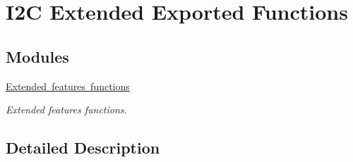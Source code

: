 \hypertarget{group___i2_c_ex___exported___functions}{}\section{I2C Extended Exported Functions}
\label{group___i2_c_ex___exported___functions}
\subsection*{Modules}
\begin{DoxyCompactItemize}
\item 
\mbox{\hyperlink{group___i2_c_ex___exported___functions___group1}{Extended features functions}}
\begin{DoxyCompactList}\small\item\em Extended features functions. \end{DoxyCompactList}\end{DoxyCompactItemize}


\subsection{Detailed Description}
